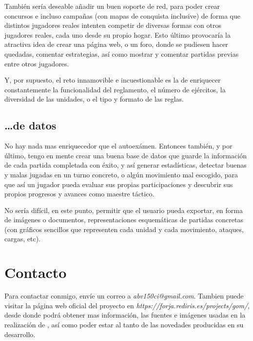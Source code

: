 También sería deseable añadir un buen soporte de red, para poder crear
concursos e incluso campañas (con mapas de conquista inclusive) de
forma que distintos jugadores reales intenten competir de diversas
formas con otros jugadores reales, cada uno desde su propio
hogar. Esto último provocaría la atractiva idea de crear una página
web, o un foro, donde se pudiesen hacer quedadas, comentar
estrategias, así como mostrar y comentar partidas previas entre otros
jugadores.

Y, por supuesto, el reto innamovible e incuestionable es la de
enriquecer constantemente la funcionalidad del reglamento, el número
de ejércitos, la diversidad de las unidades, o el tipo y formato de
las reglas.

\subsection{\ldots de datos}
No hay nada mas enriquecedor que el autoexámen. Entonces también, y
por último, tengo en mente crear una buena base de datos que guarde la
información de cada partida completada con éxito, y así generar
estadísticas, detectar buenas y malas jugadas en un turno concreto, o
algún movimiento mal escogido, para que así un jugador pueda evaluar
sus propias participaciones y descubrir sus propios progresos y
avances como maestre táctico.

No sería difícil, en este punto, permitir que el usuario pueda
exportar, en forma de imágenes o documentos, representaciones
esquemáticas de partidas concretas (con gráficos sencillos que
representen cada unidad y cada movimiento, ataques, cargas, etc).

\section{Contacto}
\label{sec:contacto}
Para contactar conmigo, envíe un correo a
\emph{abv150ci@gmail.com}. Tambien puede visitar la página web oficial
del proyecto en \emph{https://forja.rediris.es/projects/gom/}, desde
donde podrá obtener mas información, las fuentes e imágenes usadas en
la realización de \gomf, así como poder estar al tanto de las
novedades producidas en su desarrollo.
